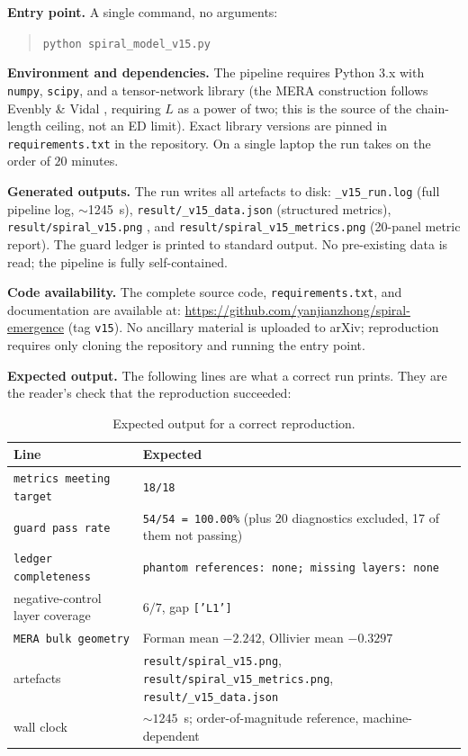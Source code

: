 \documentclass[11pt,a4paper]{article}
\newcommand{\code}[1]{\texttt{\small #1}}
\begin{document}
\medskip
\noindent\textbf{Entry point.} A single command, no arguments:

\begin{quote}
\code{python spiral\_model\_v15.py}
\end{quote}

\noindent\textbf{Environment and dependencies.} The pipeline requires Python 3.x
with \code{numpy}, \code{scipy}, and a tensor-network library (the MERA
construction follows Evenbly \& Vidal \cite{EvenblyVidal2009}, requiring $L$ as a
power of two; this is the source of the chain-length ceiling, not an ED limit).
Exact library versions are pinned in \code{requirements.txt} in the repository.
On a single laptop the run takes on the order of $20$ minutes.

\medskip
\noindent\textbf{Generated outputs.} The run writes all artefacts to disk:
\code{\_v15\_run.log} (full pipeline log, $\sim$1245~s),
\code{result/\_v15\_data.json} (structured metrics), 
\code{result/spiral_v15.png} , and
\code{result/spiral_v15_metrics.png} (20-panel metric report). The guard ledger is
printed to standard output. No pre-existing data is read; the pipeline is fully
self-contained.

\medskip
\noindent\textbf{Code availability.} The complete source code,
\code{requirements.txt}, and documentation are available at:
\url{https://github.com/yanjianzhong/spiral-emergence}
(tag \texttt{v15}). No ancillary material is uploaded to arXiv; reproduction
requires only cloning the repository and running the entry point.

\medskip
\noindent\textbf{Expected output.} The following lines are what a correct run prints. They
are the reader's check that the reproduction succeeded:

\begin{table}[h]
\centering\small
\begin{tabular}{@{}p{8.4cm}p{6.6cm}@{}}
\toprule
\textbf{Line} & \textbf{Expected} \\
\midrule
\code{metrics meeting target} & \code{18/18} \\
\code{guard pass rate} & \code{54/54 = 100.00\%} (plus 20 diagnostics excluded,
                         17 of them not passing) \\
\code{ledger completeness} & \code{phantom references: none; missing layers: none} \\
negative-control layer coverage & $6/7$, gap \code{['L1']} \\
\code{MERA bulk geometry} & Forman mean $-2.242$, Ollivier mean $-0.3297$ \\
artefacts & \code{result/spiral\_v15.png}, \code{result/spiral\_v15\_metrics.png}, \code{result/\_v15\_data.json} \\
wall clock & $\sim 1245$~s; order-of-magnitude reference, machine-dependent \\
\bottomrule
\end{tabular}
\caption{Expected output for a correct reproduction.}
\label{tab:expected}
\end{table}
\end{document}
